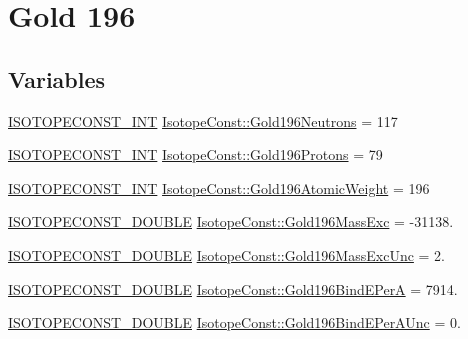 \hypertarget{group___isotope_const-_gold-_au196}{}\section{Gold 196}
\label{group___isotope_const-_gold-_au196}
\subsection*{Variables}
\begin{DoxyCompactItemize}
\item 
\mbox{\hyperlink{group___isotope_const-_macros_ga5f18360b3e99483a35c32d789e62621c}{I\+S\+O\+T\+O\+P\+E\+C\+O\+N\+S\+T\+\_\+\+I\+NT}} \mbox{\hyperlink{group___isotope_const-_gold-_au196_gaea8ee615a0af0d2e1819b6eac970079a}{Isotope\+Const\+::\+Gold196\+Neutrons}} = 117
\item 
\mbox{\hyperlink{group___isotope_const-_macros_ga5f18360b3e99483a35c32d789e62621c}{I\+S\+O\+T\+O\+P\+E\+C\+O\+N\+S\+T\+\_\+\+I\+NT}} \mbox{\hyperlink{group___isotope_const-_gold-_au196_gac00d518a3cc1d980a26bda550422f3c0}{Isotope\+Const\+::\+Gold196\+Protons}} = 79
\item 
\mbox{\hyperlink{group___isotope_const-_macros_ga5f18360b3e99483a35c32d789e62621c}{I\+S\+O\+T\+O\+P\+E\+C\+O\+N\+S\+T\+\_\+\+I\+NT}} \mbox{\hyperlink{group___isotope_const-_gold-_au196_ga96871e34b914e66d1fdf90c41ed42cc0}{Isotope\+Const\+::\+Gold196\+Atomic\+Weight}} = 196
\item 
\mbox{\hyperlink{group___isotope_const-_macros_ga8f45a7272ce02c0b4c65c44636ed719a}{I\+S\+O\+T\+O\+P\+E\+C\+O\+N\+S\+T\+\_\+\+D\+O\+U\+B\+LE}} \mbox{\hyperlink{group___isotope_const-_gold-_au196_gadc2e8a7cb6cf4f2ec6dc8edb0b9a27b5}{Isotope\+Const\+::\+Gold196\+Mass\+Exc}} = -\/31138.
\item 
\mbox{\hyperlink{group___isotope_const-_macros_ga8f45a7272ce02c0b4c65c44636ed719a}{I\+S\+O\+T\+O\+P\+E\+C\+O\+N\+S\+T\+\_\+\+D\+O\+U\+B\+LE}} \mbox{\hyperlink{group___isotope_const-_gold-_au196_ga356259995793c41efbf402cff434d41e}{Isotope\+Const\+::\+Gold196\+Mass\+Exc\+Unc}} = 2.
\item 
\mbox{\hyperlink{group___isotope_const-_macros_ga8f45a7272ce02c0b4c65c44636ed719a}{I\+S\+O\+T\+O\+P\+E\+C\+O\+N\+S\+T\+\_\+\+D\+O\+U\+B\+LE}} \mbox{\hyperlink{group___isotope_const-_gold-_au196_ga0e1453d692703267c5e45c6b6186fea3}{Isotope\+Const\+::\+Gold196\+Bind\+E\+PerA}} = 7914.
\item 
\mbox{\hyperlink{group___isotope_const-_macros_ga8f45a7272ce02c0b4c65c44636ed719a}{I\+S\+O\+T\+O\+P\+E\+C\+O\+N\+S\+T\+\_\+\+D\+O\+U\+B\+LE}} \mbox{\hyperlink{group___isotope_const-_gold-_au196_ga9f957932e374ef4dd2f2a382c90026ba}{Isotope\+Const\+::\+Gold196\+Bind\+E\+Per\+A\+Unc}} = 0.

\end{DoxyCompactItemize}
